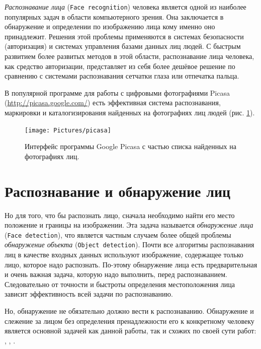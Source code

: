 \documentclass[12pt]{report}
\begin{document}

\emph{Распознавание лица} (\texttt{Face recognition}) человека является одной из наиболее популярных задач в области компьютерного зрения. Она заключается в обнаружение и определении по изображению лица кому именно оно принадлежит. Решения этой проблемы применяются в системах безопасности (авторизация) и системах управления базами данных лиц людей. %
С быстрым развитием более развитых методов в этой области, распознавание лица человека, как средство авторизации, представляет из себя более дешёвое решение по сравнению с системами распознавания сетчатки глаза или отпечатка пальца. \citep{kumar2006efficient}

В популярной программе для работы с цифровыми фотографиями Picasa (\url{http://picasa.google.com/}) есть эффективная система распознавания, маркировки и каталогизирования найденных на фотографиях лиц людей (рис. \ref{fig:picasa}). 

\begin{figure}[h]
	\centering
	\texttt{[image: Pictures/picasa]}
	\caption{Интерфейс программы Google Picasa с частью списка найденных на фотографиях лиц.}
	\label{fig:picasa}
\end{figure}

\section{Распознавание и обнаружение лиц}

Но для того, что бы распознать лицо, сначала необходимо найти его место положение и границы на изображении. Эта задача называется \emph{обнаружение лица} (\texttt{Face detection}), что является частным случаем более общей проблемы \emph{обнаружение объекта} (\texttt{Object detection}). Почти все алгоритмы распознавания лиц в качестве входных данных используют изображение, содержащее только лицо, которое надо распознать. По-этому обнаружение лица есть предварительная и очень важная задача, которую надо выполнить, перед распознаванием. Следовательно от точности и быстроты определения местоположения лица зависит эффективность всей задачи по распознаванию. 

Но, обнаружение не обязательно должно вести к распознаванию. Обнаружение и слежение за лицом без определения пренадлежности его к конкретному человеку является основной задачей как данной работы, так и схожих по своей сути работ: \citep{capi2010vision}, \citep{luo2007face}, \citep{saxena2008real}.
\end{document}

